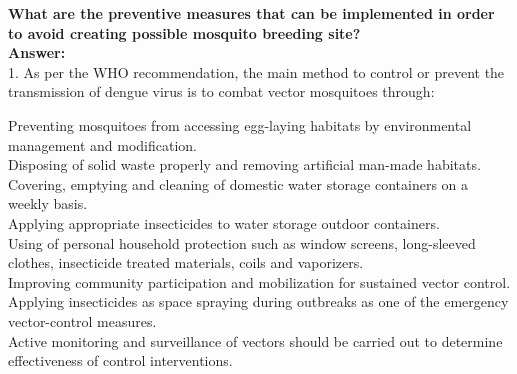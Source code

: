 \documentclass[11pt]{exam}
\begin{document}
\begin{questions}
%
%
%
%
%


\question
\label{10. Dengue: Prevention and Control }
\textbf{What are the preventive measures that can be implemented in order to avoid creating possible mosquito breeding site?} \\
\textbf{Answer:} \\
1. As per the WHO recommendation, the main method to control or prevent the transmission of dengue virus is to combat vector mosquitoes through:

Preventing mosquitoes from accessing egg-laying habitats by environmental management and modification. \\
Disposing of solid waste properly and removing artificial man-made habitats.\\
Covering, emptying and cleaning of domestic water storage containers on a weekly basis.\\
Applying appropriate insecticides to water storage outdoor containers.\\
Using of personal household protection such as window screens, long-sleeved clothes, insecticide treated materials, coils and vaporizers.\\
Improving community participation and mobilization for sustained vector control.\\
Applying insecticides as space spraying during outbreaks as one of the emergency vector-control measures.\\
Active monitoring and surveillance of vectors should be carried out to determine effectiveness of control interventions.\\




\end{questions}
\end{document}
